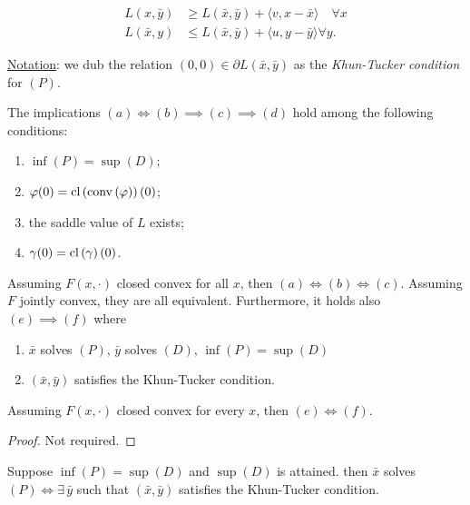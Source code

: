 \begin{align*}
    L(x,\bar{y}) &\ge L(\bar{x},\bar{y}) + \langle v, x - \bar{x} \rangle \quad \forall x \\
    L(\bar{x},y) &\le L(\bar{x},\bar{y}) + \langle u, y-\bar{y}\rangle \forall y.
\end{align*}

\underline{Notation}: we dub the relation $(0,0) \in \partial L(\bar{x},\bar{y})$ as the \emph{Khun-Tucker condition} for $(P)$. 

\begin{theorem}[Book 15]

    The implications $(a) \iff (b) \implies (c) \implies (d)$ hold among the following conditions:

    \begin{enumerate}
        \item[$(a)$] $\inf(P) = \sup(D)$;
        \item[$(b)$] $\varphi(0) = \mathrm{cl}\left(\mathrm{conv}\left(\varphi\right)\right)(0)$;
        \item[$(c)$] the saddle value of $L$ exists;
        \item[$(d)$] $\gamma(0) = \mathrm{cl}\left(\gamma\right)(0)$.
    \end{enumerate}

    Assuming $F(x,\cdot)$ closed convex for all $x$, then $(a) \iff (b) \iff (c)$. Assuming $F$ jointly convex, they are all equivalent. Furthermore, it holds also $(e) \implies (f)$ where 

    \begin{enumerate}
        \item[$(e)$] $\bar{x}$ solves $(P)$, $\bar{y}$ solves $(D)$, $\inf(P) = \sup(D)$
        \item[$(f)$] $(\bar{x},\bar{y})$ satisfies the Khun-Tucker condition.
    \end{enumerate}

    Assuming $F(x,\cdot)$ closed convex for every $x$, then $(e) \iff (f)$.
    
\end{theorem}

\begin{proof}
    Not required.
\end{proof}

\begin{corollary}
    
    Suppose $\inf(P) = \sup(D)$ and $\sup(D)$ is attained. then $\bar{x}$ solves $(P) \iff \exists \, \bar{y}$ such that $(\bar{x},\bar{y})$ satisfies the Khun-Tucker condition.

\end{corollary}

